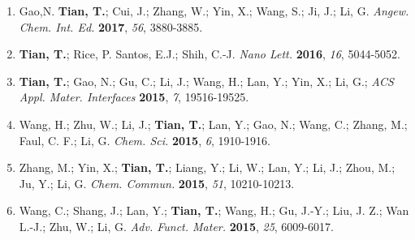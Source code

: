\documentclass[margin]{res}
\begin{document}
\begin{resume}
\begin{enumerate}
  \item Gao,N. \textbf{Tian, T.}; Cui, J.; Zhang, W.; Yin, X.; Wang,
    S.; Ji, J.; Li, G. \textit{Angew. Chem. Int. Ed.} \textbf{2017},
    \textit{56}, 3880-3885.
    \item \textbf{Tian, T.}; Rice, P. Santos, E.J.; Shih,
    C.-J. \textit{Nano Lett.} \textbf{2016}, \textit{16}, 5044-5052.
    
    \item \textbf{Tian, T.}; Gao, N.; Gu, C.; Li, J.; Wang, H.; Lan, Y.;
    Yin, X.; Li, G.; \textit{ACS Appl. Mater. Interfaces}
    \textbf{2015}, \textit{7}, 19516-19525.
    
  \item Wang, H.; Zhu, W.; Li, J.; \textbf{Tian, T.}; Lan, Y.; Gao,
    N.; Wang, C.; Zhang, M.; Faul, C. F.; Li, G. \textit{Chem. Sci.}
    \textbf{2015}, \textit{6}, 1910-1916.
    
  \item Zhang, M.; Yin, X.; \textbf{Tian, T.}; Liang, Y.; Li, W.; Lan,
    Y.; Li, J.; Zhou, M.; Ju, Y.; Li, G. \textit{Chem. Commun.}
    \textbf{2015}, \textit{51}, 10210-10213.
    
  \item Wang, C.; Shang, J.; Lan, Y.; \textbf{Tian, T.}; Wang, H.; Gu,
    J.-Y.; Liu, J. Z.; Wan L.-J.; Zhu, W.; Li,
    G. \textit{Adv. Funct. Mater.} \textbf{2015}, \textit{25},
    6009-6017.
    

\end{enumerate}
\end{resume}
\end{document}

